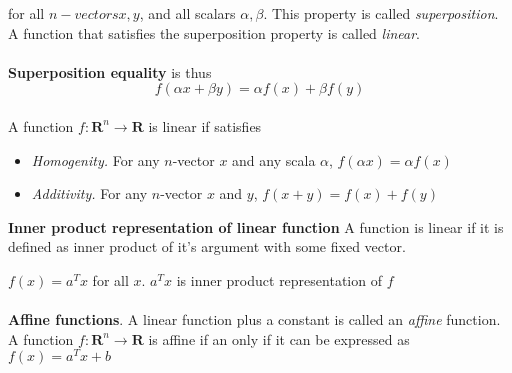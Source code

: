 \documentclass[a4paper, 12pt]{article}
\begin{document}
for all $n-vectors x, y$, and all scalars $\alpha, \beta$. This property is called \textit{superposition}.
 A function that satisfies the superposition property is called \textit{linear}.
\\
\\
\textbf{Superposition equality} is thus
\begin{equation}
f(\alpha x + \beta y) = \alpha f(x) + \beta f(y)
\end{equation}
\\
A function  $ f: \mathbf{R}^n \to \mathbf{R} $ is linear if satisfies
\begin{itemize}
\item \textit{Homogenity.} For any $n$-vector $x$ and any scala $\alpha$, $f(\alpha x) = \alpha f(x)$
\item \textit{Additivity.} For any $n$-vector $x$ and $y$, $f(x + y) = f(x) + f(y)$
\end{itemize}

\textbf{Inner product representation of linear function}
A function is linear if it is defined as inner product of it's argument with some fixed vector.

$f(x) = a^Tx$ for all $x$.
$a^Tx$ is inner product representation of $f$
\\
\\
\textbf{Affine functions}. A linear function plus a constant is called an \textit{affine} function.
A function $f: \mathbf{R} ^n \to \mathbf{R}$ is affine if an only if it can be expressed as $f(x) = a^T x + b$
\end{document}
